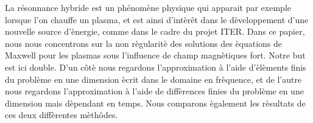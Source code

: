 La r\'esonnance hybride est un ph\'enom\`ene physique qui apparait par exemple lorsque l'on chauffe un plasma, et est ainsi d'int\`er\^et dans le d\`eveloppement d'une nouvelle source d'\`energie, comme dans le cadre du projet ITER. Dans ce papier, nous nous concentrons sur la non r\`egularit\`e des solutions des \`equations de Maxwell pour les plasmas sous l'influence de champ magn\`etiques fort. Notre but est ici double. D'un c\^ot\`e nous regardons l'approximation \`a l'aide d'\`el\`ements finis du probl\`eme en une dimension \`ecrit dans le domaine en fr\`equence, et de l'autre nous regardons l'approximation \`a l'aide de diff\`erences finies du probl\`eme en une dimension mais d\`ependant en temps. Nous comparons \`egalement les r\`esultats de ces deux diff\`erentes m\`eth\^odes.